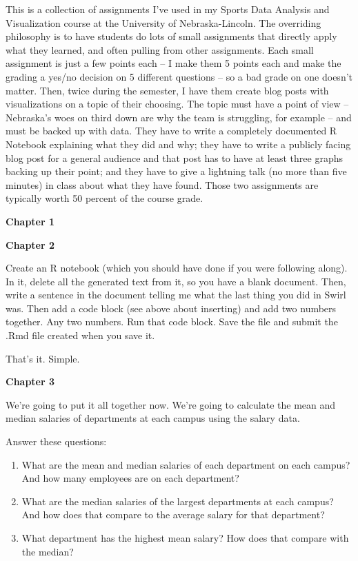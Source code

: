 \documentclass[]{book}
\providecommand{\tightlist}{%
  \setlength{\itemsep}{0pt}\setlength{\parskip}{0pt}}
\begin{document}
This is a collection of assignments I've used in my Sports Data Analysis
and Visualization course at the University of Nebraska-Lincoln. The
overriding philosophy is to have students do lots of small assignments
that directly apply what they learned, and often pulling from other
assignments. Each small assignment is just a few points each -- I make
them 5 points each and make the grading a yes/no decision on 5 different
questions -- so a bad grade on one doesn't matter. Then, twice during
the semester, I have them create blog posts with visualizations on a
topic of their choosing. The topic must have a point of view --
Nebraska's woes on third down are why the team is struggling, for
example -- and must be backed up with data. They have to write a
completely documented R Notebook explaining what they did and why; they
have to write a publicly facing blog post for a general audience and
that post has to have at least three graphs backing up their point; and
they have to give a lightning talk (no more than five minutes) in class
about what they have found. Those two assignments are typically worth 50
percent of the course grade.

\textbf{Chapter 1}

\textbf{Chapter 2}

Create an R notebook (which you should have done if you were following
along). In it, delete all the generated text from it, so you have a
blank document. Then, write a sentence in the document telling me what
the last thing you did in Swirl was. Then add a code block (see above
about inserting) and add two numbers together. Any two numbers. Run that
code block. Save the file and submit the .Rmd file created when you save
it.

That's it. Simple.

\textbf{Chapter 3}

We're going to put it all together now. We're going to calculate the
mean and median salaries of departments at each campus using the salary
data.

Answer these questions:

\begin{enumerate}
\def\labelenumi{\arabic{enumi}.}
\tightlist
\item
  What are the mean and median salaries of each department on each
  campus? And how many employees are on each department?
\item
  What are the median salaries of the largest departments at each
  campus? And how does that compare to the average salary for that
  department?
\item
  What department has the highest mean salary? How does that compare
  with the median?
\end{enumerate}
\end{document}
